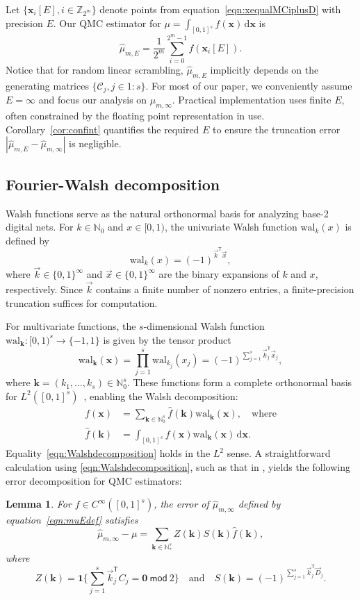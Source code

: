 \documentclass{article}
\newtheorem{lemma}{Lemma}
\theoremstyle{definition}
\newcommand{\tmod}{\ \mathsf{mod}\ }
\newcommand{\ints}{\mathbb{Z}}
\newcommand{\natu}{\mathbb{N}}
\newcommand{\bsk}{\boldsymbol{k}}
\newcommand{\bsx}{\boldsymbol{x}}
\newcommand{\bszero}{\boldsymbol{0}}
\newcommand{\bsone}{\boldsymbol{1}}
\newcommand{\rd}{\,\mathrm{d}}
\newcommand{\tran}{\mathsf{T}}
\newcommand{\walk}{\mathrm{wal}_k}
\newcommand{\walbsk}{\mathrm{wal}_{\bsk}}
\begin{document}
Let $\{\bsx_{i}[E],i\in \ints_{2^m}\}$ denote points from equation~\eqref{eqn:xequalMCiplusD} with precision $E$. Our QMC estimator for $\mu=\int_{[0,1]^s}f(\bsx)\rd\bsx$ is
\begin{equation}\label{eqn:muEdef}
   \hat\mu_{m,E} = \frac1{2^m}\sum_{i=0}^{2^m-1}f\left(\bsx_i[E]\right). 
\end{equation}
Notice that for random linear scrambling, $ \hat\mu_{m,E}$ implicitly depends on the generating matrices $\{\mathcal{C}_j,j \in 1{:}s\}$. For most of our paper, we conveniently assume $E=\infty$ and focus our analysis on $\hat{\mu}_{m,\infty}$. Practical implementation uses finite $E$, often constrained by the floating point representation in use.  Corollary~\ref{cor:confint} quantifies the required $E$ to ensure the truncation error $|\hat{\mu}_{m,E}-\hat{\mu}_{m,\infty}|$ is negligible.

\subsection{Fourier-Walsh decomposition}

Walsh functions serve as the natural orthonormal basis for analyzing base-2 digital nets. For $k\in\natu_0$ and $x\in[0,1)$, the univariate
Walsh function $\walk(x)$ is defined by
$$
\walk(x) = (-1)^{\vec{k}^\tran\vec{x}},
$$
where $\vec{k}\in \{0,1\}^\infty$ and $\vec{x}\in \{0,1\}^\infty$ are the binary expansions of $k$ and $x$, respectively. Since $\vec{k}$ contains a finite number of nonzero entries, a finite-precision truncation suffices for computation.

For multivariate functions, the $s$-dimensional Walsh function $\walbsk:[0,1)^s\to\{-1,1\}$ is given by the tensor product
$$
\walbsk(\bsx) =\prod_{j=1}^s\mathrm{wal}_{k_j}(x_j)
=(-1)^{\sum_{j=1}^s\vec{k}_j^\tran \vec{x}_j},
$$
where $\bsk=(k_1,\dots,k_s)\in \natu^s_0$. These functions form a complete orthonormal basis for $L^2([0,1]^s)$~\cite{dick:pill:2010}, enabling the Walsh decomposition:
\begin{align}\label{eqn:Walshdecomposition}
f(\bsx) &= \sum_{\bsk\in\natu_0^s}\hat f(\bsk) \walbsk(\bsx),\quad\text{where}\\
\hat f(\bsk) &= \int_{[0,1]^s}f(\bsx)\walbsk(\bsx)\rd\bsx. \nonumber
\end{align}
Equality~\eqref{eqn:Walshdecomposition} holds in the $L^2$ sense. A straightforward calculation using \eqref{eqn:Walshdecomposition}, such as that in \cite[Theorem 1]{superpolymulti}, yields the following error decomposition for QMC estimators:
\begin{lemma}\label{lem:decomp}
For $f\in C^\infty([0,1]^s)$, the error of $\hat{\mu}_{m,\infty}$ defined by equation~\eqref{eqn:muEdef} satisfies
\begin{equation}\label{eqn:errordecomposition}
    \hat{\mu}_{m,\infty}-\mu=\sum_{\bsk\in \natu_*^s}Z(\bsk)S(\bsk)\hat{f}(\bsk),
\end{equation}
where
$$Z(\bsk)=\bsone\Big\{\sum_{j=1}^s \vec{k}_j^\tran  C_j=\bszero \tmod 2\Big\} \quad\text{and}\quad S(\bsk) = (-1)^{\sum_{j=1}^s\vec{k}_j^\tran \vec{D}_j}.$$
\end{lemma}
\end{document}
